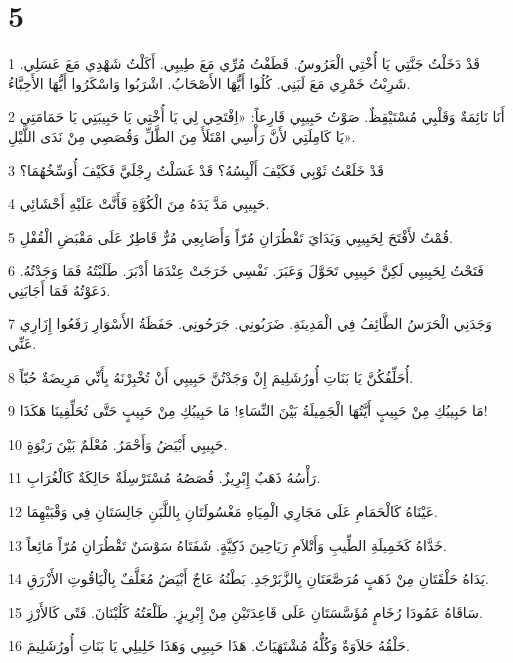 \chapter{5}

\par 1 قَدْ دَخَلْتُ جَنَّتِي يَا أُخْتِي الْعَرُوسُ. قَطَفْتُ مُرِّي مَعَ طِيبِي. أَكَلْتُ شَهْدِي مَعَ عَسَلِي. شَرِبْتُ خَمْرِي مَعَ لَبَنِي. كُلُوا أَيُّهَا الأَصْحَابُ. اشْرَبُوا وَاسْكَرُوا أَيُّهَا الأَحِبَّاءُ.
\par 2 أَنَا نَائِمَةٌ وَقَلْبِي مُسْتَيْقِظٌ. صَوْتُ حَبِيبِي قَارِعاً: «اِفْتَحِي لِي يَا أُخْتِي يَا حَبِيبَتِي يَا حَمَامَتِي يَا كَامِلَتِي لأَنَّ رَأْسِي امْتَلَأَ مِنَ الطَّلِّ وَقُصَصِي مِنْ نَدَى اللَّيْلِ».
\par 3 قَدْ خَلَعْتُ ثَوْبِي فَكَيْفَ أَلْبِسُهُ؟ قَدْ غَسَلْتُ رِجْلَيَّ فَكَيْفَ أُوَسِّخُهُمَا؟
\par 4 حَبِيبِي مَدَّ يَدَهُ مِنَ الْكُوَّةِ فَأَنَّتْ عَلَيْهِ أَحْشَائِي.
\par 5 قُمْتُ لأَفْتَحَ لِحَبِيبِي وَيَدَايَ تَقْطُرَانِ مُرّاً وَأَصَابِعِي مُرٌّ قَاطِرٌ عَلَى مَقْبَضِ الْقُفْلِ.
\par 6 فَتَحْتُ لِحَبِيبِي لَكِنَّ حَبِيبِي تَحَوَّلَ وَعَبَرَ. نَفْسِي خَرَجَتْ عِنْدَمَا أَدْبَرَ. طَلَبْتُهُ فَمَا وَجَدْتُهُ. دَعَوْتُهُ فَمَا أَجَابَنِي.
\par 7 وَجَدَنِي الْحَرَسُ الطَّائِفُ فِي الْمَدِينَةِ. ضَرَبُونِي. جَرَحُونِي. حَفَظَةُ الأَسْوَارِ رَفَعُوا إِزَارِي عَنِّي.
\par 8 أُحَلِّفُكُنَّ يَا بَنَاتِ أُورُشَلِيمَ إِنْ وَجَدْتُنَّ حَبِيبِي أَنْ تُخْبِرْنَهُ بِأَنِّي مَرِيضَةٌ حُبّاً.
\par 9 مَا حَبِيبُكِ مِنْ حَبِيبٍ أَيَّتُهَا الْجَمِيلَةُ بَيْنَ النِّسَاءِ! مَا حَبِيبُكِ مِنْ حَبِيبٍ حَتَّى تُحَلِّفِينَا هَكَذَا!
\par 10 حَبِيبِي أَبْيَضُ وَأَحْمَرُ. مُعْلَمٌ بَيْنَ رَبْوَةٍ.
\par 11 رَأْسُهُ ذَهَبٌ إِبْرِيزٌ. قُصَصُهُ مُسْتَرْسِلَةٌ حَالِكَةٌ كَالْغُرَابِ.
\par 12 عَيْنَاهُ كَالْحَمَامِ عَلَى مَجَارِي الْمِيَاهِ مَغْسُولَتَانِ بِاللَّبَنِ جَالِسَتَانِ فِي وَقْبَيْهِمَا.
\par 13 خَدَّاهُ كَخَمِيلَةِ الطِّيبِ وَأَتْلاَمِ رَيَاحِينَ ذَكِيَّةٍ. شَفَتَاهُ سَوْسَنٌ تَقْطُرَانِ مُرّاً مَائِعاً.
\par 14 يَدَاهُ حَلْقَتَانِ مِنْ ذَهَبٍ مُرَصَّعَتَانِ بِالزَّبَرْجَدِ. بَطْنُهُ عَاجٌ أَبْيَضُ مُغَلَّفٌ بِالْيَاقُوتِ الأَزْرَقِ.
\par 15 سَاقَاهُ عَمُودَا رُخَامٍ مُؤَسَّسَتَانِ عَلَى قَاعِدَتَيْنِ مِنْ إِبْرِيزٍ. طَلْعَتُهُ كَلُبْنَانَ. فَتًى كَالأَرْزِ.
\par 16 حَلْقُهُ حَلاَوَةٌ وَكُلُّهُ مُشْتَهَيَاتٌ. هَذَا حَبِيبِي وَهَذَا خَلِيلِي يَا بَنَاتِ أُورُشَلِيمَ.

